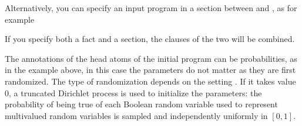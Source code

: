 \documentclass[letterpaper,10pt,english]{sphinxmanual}
\begin{document}
\begin{sphinxVerbatim}[commandchars=\\\{\}]
    \PYG{p}{[} 
 
 
   \PYG{p}{]}
\end{sphinxVerbatim}

\sphinxAtStartPar
Alternatively, you can specify an input program in a section between  and , as for example

\begin{sphinxVerbatim}[commandchars=\\\{\}]
 

 
 
 

 
\end{sphinxVerbatim}

\sphinxAtStartPar
If you specify both a  fact and a section, the clauses of the two will be combined.

\sphinxAtStartPar
The annotations of the head atoms of the initial program can be probabilities, as in the example above, in this case the parameters do not matter as they are first randomized. The type of randomization depends on the setting .
If it takes value 0, a truncated Dirichlet process is used to initialize the parameters: the probability of being true of each Boolean random variable used to represent multivalued random variables is sampled and independently uniformly in \([0,1]\).
\end{document}
